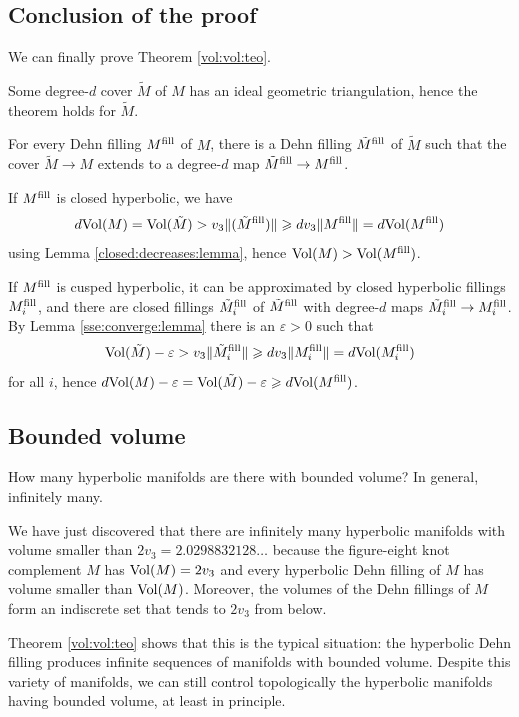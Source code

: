 \subsection{Conclusion of the proof}
We can finally prove Theorem \ref{vol:vol:teo}.

Some degree-$d$ cover $\tilde M$ of $M$ has an ideal geometric triangulation, hence the theorem holds for $\tilde M$. 

For every Dehn filling $M^{\rm fill}$ of $M$, there is a Dehn filling $\tilde M^{\rm fill}$ of $\tilde M$ such that the cover $\tilde M \to M$ extends to a degree-$d$ map $\tilde M^{\rm fill} \to M^{\rm fill}$. 

If $M^{\rm fill}$ is closed hyperbolic, we have 
$$d{\rm Vol}(M) ={\rm Vol}(\tilde M) > v_3\| (\tilde M^{\rm fill})\|  \geqslant dv_3\|M^{\rm fill}\| =d{\rm Vol}(M^{\rm fill}) $$
using Lemma \ref{closed:decreases:lemma}, hence ${\rm Vol}(M) > {\rm Vol}(M^{\rm fill})$. 

If $M^{\rm fill}$ is cusped hyperbolic, it can be approximated by closed hyperbolic fillings $M^{\rm fill}_i$, and there are closed fillings $\tilde M^{\rm fill}_i$ of $\tilde M^{\rm fill}$ with degree-$d$ maps $\tilde M^{\rm fill}_i \to M^{\rm fill}_i$.
By Lemma \ref{sse:converge:lemma} there is an $\varepsilon > 0$ such that 
$${\rm Vol}(\tilde M) - \varepsilon > v_3\|\tilde M^{\rm fill}_i\| \geqslant d v_3\|M^{\rm fill}_i\| = d{\rm Vol}(M^{\rm fill}_i)$$
for all $i$, hence $d{\rm Vol}(M) - \varepsilon = {\rm Vol}(\tilde M) - \varepsilon \geqslant d{\rm Vol}(M^{\rm fill})$. 
\finedimo

\subsection{Bounded volume}
How many hyperbolic manifolds are there with bounded volume? In general, infinitely many. 

We have just discovered that there are infinitely many hyperbolic manifolds with volume smaller than $2v_3 = 2.0298832128 \ldots$ because the figure-eight knot complement $M$ has ${\rm Vol}(M) = 2v_3$ and every hyperbolic Dehn filling of $M$ has volume smaller than ${\rm Vol}(M)$. Moreover, the volumes of the Dehn fillings of $M$ form an indiscrete set that tends to $2v_3$ from below.

Theorem \ref{vol:vol:teo} shows that this is the typical situation: the hyperbolic Dehn filling produces infinite sequences of manifolds with bounded volume. Despite this variety of manifolds, we can still control topologically the hyperbolic manifolds having bounded volume, at least in principle.


